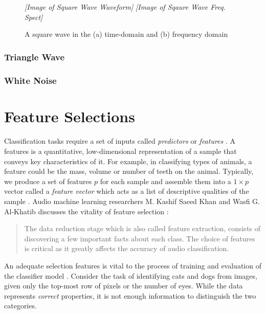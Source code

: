 \documentclass[12pt,letterpaper]{article}
\begin{document}
\begin{figure}[h]
\begin{center}
	\textit{[Image of Square Wave Waveform]}
	\textit{[Image of Sqaure Wave Freq. Spect]}
\end{center}
\caption{A square wave in the (a) time-domain and (b) frequency domain}
\label{fig-SquareWave}
\end{figure}


\subsubsection{Triangle Wave}


\subsubsection{White Noise}



\newpage
\section{Feature Selections}
\label{sec-Features}

\paragraph*{}Classification tasks require a set of inputs called \textit{predictors} or \textit{features} \cite{James,Loy,Serizel}. A features is a quantitative, low-dimensional representation of a sample that conveys key characteristics of it. For example, in classifying types of animals, a feature could be the mass, volume or number of teeth on the animal. Typically, we produce a set of features $p$ for each sample and assemble them into a $1 \times p$ vector called a \textit{feature vector} which acts as a list of descriptive qualities of the sample \cite{Geron,James}.
Audio machine learning researchers M. Kashif Saeed Khan and Wasfi G. Al-Khatib discusses the vitality of feature selection \cite{Khan}:
\begin{quote}
The data reduction stage which is also called feature extraction, consists of discovering a few important facts about each class. The choice of features is critical as it greatly affects the accuracy of audio classification. 
\end{quote}
An adequate selection features is vital to the process of training and evaluation of the classifier model \cite{Mierswa,Serizel,Liu}. Consider the task of identifying cats and dogs from images, given only the top-most row of pixels or the number of eyes. While the data represents \textit{correct} properties, it is not enough information to distinguish the two categories.
\end{document}
